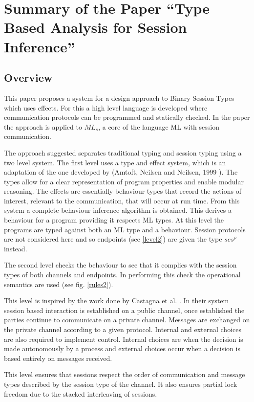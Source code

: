 \chapter{Summary of the Paper ``Type Based Analysis for Session Inference''}

\section{Overview} \label{overview}
This paper\cite{paper1} proposes a system for a design approach to Binary Session Types which uses effects. For this a high level language is developed where communication protocols can be programmed and statically checked. In the paper the approach is applied to $ML_s$, a core of the language ML with session communication.

The approach suggested separates traditional typing and session typing using a two level system. The first level uses a type and effect system, which is an adaptation of the one developed by (Amtoft, Neilsen and Neilsen, 1999 )\cite{amtoft}. The types allow for a clear representation of program properties and enable modular reasoning. The effects are essentially behaviour types that record the actions of interest, relevant to the communication, that will occur at run time. From this system a complete behaviour inference algorithm is obtained. This derives a behaviour for a program providing it respects ML types. At this level the programs are typed against both an ML type and a behaviour. Session protocols are not considered here and so endpoints (see \ref{level2}) are given the type $ses^\rho$ instead.   

The second level checks the behaviour to see that it complies with the session types of both channels and endpoints. In performing this check the operational semantics are used (see fig. \ref{rules2}). 

This level is inspired by the work done by Castagna et al. \cite{foundSessTypes}. In their system session based interaction is established on a public channel, once established the parties continue to communicate on a private channel. Messages are exchanged on the private channel according to a given protocol. Internal and external choices are also required to implement control. Internal choices are when the decision is made autonomously by a process and external choices occur when a decision is based entirely on messages received. 

This level ensures that sessions respect the order of communication and message types described by the session type of the channel. It also ensures partial lock freedom due to the stacked interleaving of sessions. 

